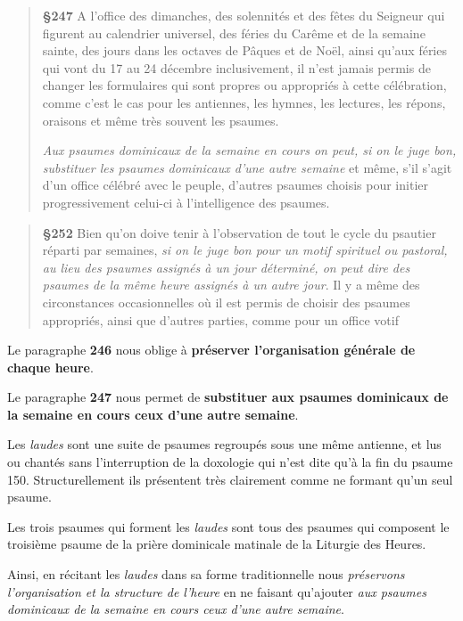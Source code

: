 \documentclass[oneside, 10pt]{article}
\begin{document}
\begin{quotation}
\textbf{§247} A l'office des dimanches, des solennités et des fêtes du Seigneur qui figurent au
calendrier universel, des féries du Carême et de la semaine sainte, des jours dans les octaves
de Pâques et de Noël, ainsi qu'aux féries qui vont du 17 au 24 décembre
inclusivement, il n'est jamais permis de changer les formulaires qui sont propres ou appropriés à cette célébration,
comme c'est le cas pour les antiennes, les hymnes, les lectures, les répons, oraisons et même
très souvent les psaumes.

\emph{Aux psaumes dominicaux de la semaine en cours on peut, si on le juge bon, substituer les
psaumes dominicaux d'une autre semaine} et même, s'il s'agit d'un office célébré avec le
peuple, d'autres psaumes choisis pour initier progressivement celui-ci à l'intelligence des
psaumes.
\end{quotation}

\begin{quotation}
\textbf{§252} Bien qu'on doive tenir à l'observation de tout le cycle du psautier réparti par semaines, \emph{si
on le juge bon pour un motif spirituel ou pastoral, au lieu des psaumes assignés à un jour
déterminé, on peut dire des psaumes de la même heure assignés à un autre jour}. Il y a même
des circonstances occasionnelles où il est permis de choisir des psaumes appropriés, ainsi que
d'autres parties, comme pour un office votif
\end{quotation}

Le paragraphe \textbf{246} nous oblige à \textbf{préserver l'organisation générale de chaque heure}.

Le paragraphe \textbf{247} nous permet de \textbf{substituer aux psaumes dominicaux de la semaine en cours ceux d'une autre semaine}.

Les \emph{laudes} sont une suite de psaumes regroupés sous une même antienne, et lus ou chantés sans l'interruption de la doxologie qui n'est dite qu'à la fin du psaume 150. Structurellement ils présentent très clairement comme ne formant qu'un seul psaume.

Les trois psaumes qui forment les \emph{laudes} sont tous des psaumes qui composent le troisième psaume de la prière dominicale matinale de la Liturgie des Heures.

Ainsi, en récitant les \emph{laudes} dans sa forme traditionnelle nous \emph{préservons l'organisation et la structure de l'heure} en ne faisant qu'ajouter \emph{aux psaumes dominicaux de la semaine en cours ceux d'une autre semaine}.
\end{document}
